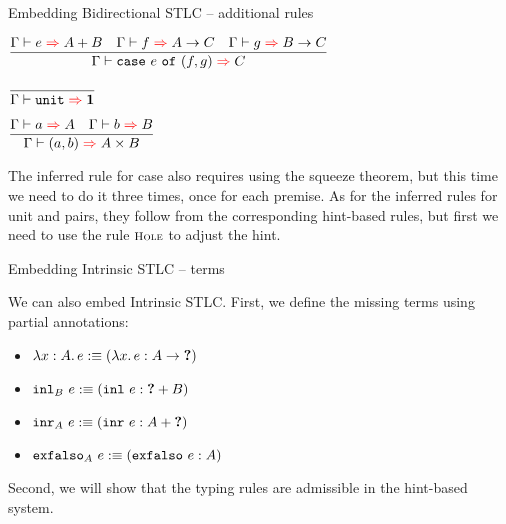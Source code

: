 \documentclass{beamer}
\begin{document}
\begin{frame}{Embedding Bidirectional STLC -- additional rules}

\begin{center}
  $\infrule{\infer{e}{\Sum{A}{B}} \quad \infer{f}{\Fun{A}{C}} \quad \infer{g}{\Fun{B}{C}}}{\infer{\case{e}{f}{g}}{C}}$

  \vspace{2em}

  $\infrule{}{\infer{\unit}{\Unit}}$

  \vspace{2em}

  $\infrule{\infer{a}{A} \quad \infer{b}{B}}{\infer{\pair{a}{b}}{\Prod{A}{B}}}$
\end{center}

\vspace{1em}

The inferred rule for case also requires using the squeeze theorem, but this time we need to do it three times, once for each premise. As for the inferred rules for unit and pairs, they follow from the corresponding hint-based rules, but first we need to use the rule $\textsc{\footnotesize{Hole}}$ to adjust the hint.

\end{frame}

\begin{frame}{Embedding Intrinsic STLC -- terms}

We can also embed Intrinsic STLC. First, we define the missing terms using partial annotations:

\begin{itemize}
  \item $\lambda x : A.\, e :\equiv (\lambda x.\, e : A \to \textbf{?})$ \\
  \item $\texttt{inl}_{B}\ e :\equiv (\texttt{inl}\ e : \textbf{?} + B)$ \\
  \item $\texttt{inr}_{A}\ e :\equiv (\texttt{inr}\ e : A + \textbf{?})$ \\
  \item $\texttt{exfalso}_{A}\ e :\equiv (\texttt{exfalso}\ e : A)$
\end{itemize}

\vspace{2em}

Second, we will show that the typing rules are admissible in the hint-based system.

\end{frame}
\end{document}
